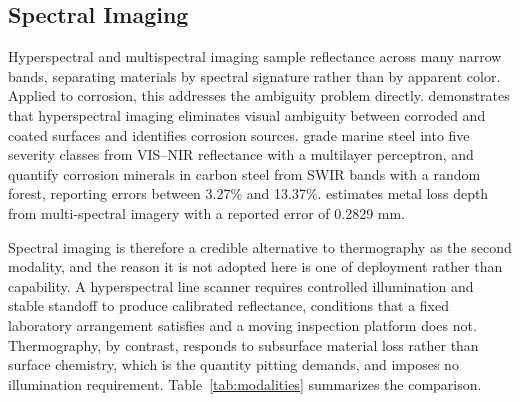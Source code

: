 \subsection{Spectral Imaging}

Hyperspectral and multispectral imaging sample reflectance across many narrow
bands, separating materials by spectral signature rather than by apparent color.
Applied to corrosion, this addresses the ambiguity problem directly.
\citet{Lavadiya2022} demonstrates that hyperspectral imaging eliminates visual
ambiguity between corroded and coated surfaces and identifies corrosion sources.
\citet{Arias2025} grade marine steel into five severity classes from VIS--NIR
reflectance with a multilayer perceptron, and \citet{DeKerf2022} quantify corrosion
minerals in carbon steel from SWIR bands with a random forest, reporting errors
between 3.27\% and 13.37\%. \citet{Egodawela2025} estimates metal loss depth from
multi-spectral imagery with a reported error of 0.2829 mm.

Spectral imaging is therefore a credible alternative to thermography as the
second modality, and the reason it is not adopted here is one of deployment
rather than capability. A hyperspectral line scanner requires controlled
illumination and stable standoff to produce calibrated reflectance, conditions
that a fixed laboratory arrangement satisfies and a moving inspection platform
does not. Thermography, by contrast, responds to subsurface material loss rather
than surface chemistry, which is the quantity pitting demands, and imposes no
illumination requirement. Table~\ref{tab:modalities} summarizes the comparison.

